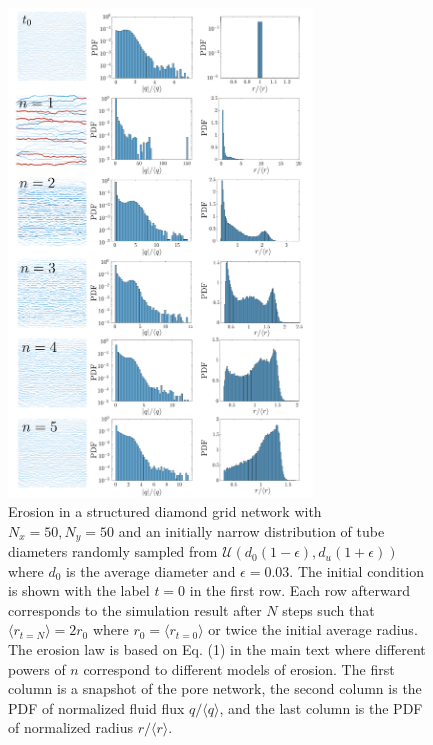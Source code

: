 \documentclass[%
reprint,
 amsmath,amssymb,
 aps,
prl,
]{revtex4-1}
\begin{document}
%
\begin{figure}[htp]
 \includegraphics[width=0.72\textwidth]{FigS4.pdf}
     \caption{Erosion in a structured diamond grid network with $N_x=50, N_y=50$ and an initially narrow distribution of tube diameters randomly sampled from  $\mathcal{U}\left(d_0(1-\epsilon), d_u(1+\epsilon)\right) $ where  $d_0$ is the average diameter and $\epsilon=0.03$. The initial condition is shown with the label $t=0$ in the first row. Each row afterward corresponds to the simulation result after $N$ steps such that $\langle r_{t=N}\rangle=2r_0$ where $r_0 = \langle r_{t=0}\rangle$ or twice the initial average radius. The erosion law is based on Eq. (1) in the main text where different powers of $n$ correspond to different models of erosion. The first column is a snapshot of the pore network, the second column is the PDF of normalized fluid flux $q/\langle q \rangle$, and the last column is the PDF of normalized radius $r/\langle r\rangle$.}\label{SI_figs4:fig:fig2}%
\end{figure}




\newpage 
\newpage 
\newpage
\end{document}
